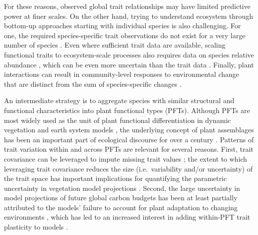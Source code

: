 \documentclass{article}
\begin{document}
For these reasons, observed global trait relationships may have limited predictive power at finer scales.
On the other hand, trying to understand ecosystem through bottom-up approaches starting with individual species is also challenging.
For one, the required species-specific trait observations do not exist for a very large number of species \citep{cornwell_2019_what}.
Even where sufficient trait data are available, scaling functional traits to ecosystem-scale processes also requires data on species relative abundance \citep{grime_1998_benefits},
which can be even more uncertain than the trait data \citep{clark_2016_why}.
Finally, plant interactions can result in community-level responses to environmental change that are distinct from the sum of species-specific changes \citep{poorter_2003_plant}.

An intermediate strategy is to aggregate species with similar structural and functional characteristics into plant functional types (PFTs).
Although PFTs are most widely used as the unit of plant functional differentiation in dynamic vegetation and earth system models
\citep{lavorel_1997_plant_functional_classifications,wullschleger_2014_plant,prentice_1992_special_paper},
the underlying concept of plant assemblages has been an important part of ecological discourse for over a century \citep{cowles_1899_ecological,clements_1936_nature,naeem_2003_disentangling}.
Patterns of trait variation within and across PFTs are relevant for several reasons.
First, trait covariance can be leveraged to impute missing trait values \citep{swenson_2013_phylogenetic};
the extent to which leveraging trait covariance reduces the size (i.e.\ variability and/or uncertainty) of the trait space has important implications for
quantifying the parametric uncertainty in vegetation model projections \citep{dietze_2013_improving,lebauer_2013_facilitating,dietze_2014_quantitative}.
Second, the large uncertainty in model projections of future global carbon budgets \citep{friedlingstein_2006_climate,friedlingstein_2014_uncertainties}
has been at least partially attributed to the models' failure to account for plant adaptation to changing environments \citep{sitch_2008_evaluation},
which has led to an increased interest in adding within-PFT trait plasticity to models \citep{van_2011_going,verheijen_2015_inclusion}.
\end{document}
